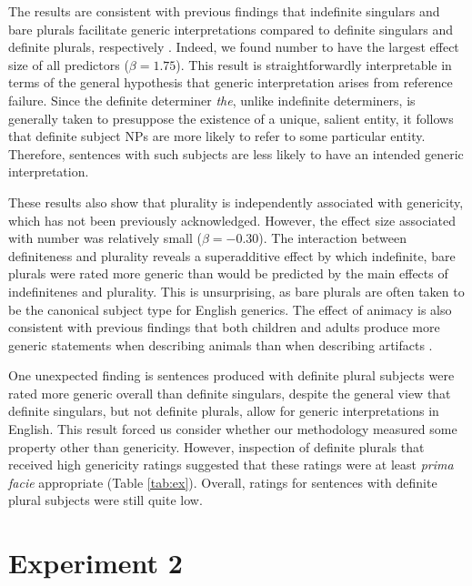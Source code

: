 \documentclass[10pt,letterpaper]{article}
\begin{document}
The results are consistent with previous findings that indefinite singulars and bare plurals facilitate generic interpretations compared to definite singulars and definite plurals, respectively \cite{Cimpian:2011, Gelman:2003}. Indeed, we found number to have the largest effect size of all predictors (\(\beta = 1.75\)). This result is straightforwardly interpretable in terms of the general hypothesis that generic interpretation arises from reference failure. Since the definite determiner \textit{the}, unlike indefinite determiners, is generally taken to presuppose the existence of a unique, salient entity, it follows that definite subject NPs are more likely to refer to some particular entity. Therefore, sentences with such subjects are less likely to have an intended generic interpretation.

These results also show that plurality is independently associated with genericity, which has not been previously acknowledged. However, the effect size associated with number was relatively small (\(\beta = -0.30\)). The interaction between definiteness and plurality reveals a superadditive effect by which indefinite, bare plurals were rated more generic than would be predicted by the main effects of indefinitenes and plurality. This is unsurprising, as bare plurals are often taken to be the canonical subject type for English generics. The effect of animacy is also consistent with previous findings that both children and adults produce more generic statements when describing animals than when describing artifacts \cite{Brandone:2009}.

One unexpected finding is sentences produced with definite plural subjects were rated more generic overall than definite singulars, despite the general view that definite singulars, but not definite plurals, allow for generic interpretations in English. This result forced us consider whether our methodology measured some property other than genericity. However, inspection of definite plurals that received high genericity ratings suggested that these ratings were at least \emph{prima facie} appropriate (Table \ref{tab:ex}). Overall, ratings for sentences with definite plural subjects were still quite low.

\section{Experiment 2}
\end{document}
